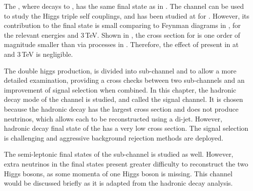 The {\HepProcess{ \Pem \Pep \to \PZ \PHiggs \PHiggs}\xspace}, where \PZ decays to \Pnu \APnu, has the same \HepProcess{\PHiggs \PHiggs \Pnu \APnu} final state as in . The \HepProcess{\PZ \PHiggs \PHiggs} channel can be used to study the Higgs triple self couplings, and has been studied at \ILC for  \cite{Baer:2013cma}. However, its contribution to the \HepProcess{\PHiggs \PHiggs \Pnu \APnu} final state is small comparing to Feynman diagrams in , for the relevant  \CLIC energies  and 3\,TeV. Shown in , the cross section for {\HepProcess{ \Pem \Pep \to \PZ \PHiggs \PHiggs}\xspace} is one order of magnitude smaller than \eeToHH via processes in . Therefore, the effect of {\HepProcess{ \Pem \Pep \to \PZ \PHiggs \PHiggs}\xspace} present in \eeToHH at  and 3\,TeV is negligible.






The double higgs production, \eeToHH is divided into sub-channel \eeToHHbbWW and \eeToHHbbbb to allow a more detailed examination, providing a cross checks between two sub-channels and an improvement of signal selection when combined. In this chapter, the \PW hadronic decay mode of the \eeToHHbbWW channel is studied, and called the signal channel. It is chosen because the hadronic decay has the largest cross section and does not produce neutrinos, which allows each \PW to be reconstructed using a di-jet. However, hadronic decay final state of the \eeToHHbbWW has a very low cross section. The signal selection is challenging and aggressive background rejection methods are deployed.

The semi-leptonic final states of the  sub-channel \eeToHHbbWW is studied as well. However, extra neutrinos in the final states present greater difficulty to reconstruct the two Higgs bosons, as some momenta of one Higgs boson is missing. This channel would be discussed briefly as it is adapted from the hadronic decay analysis.

